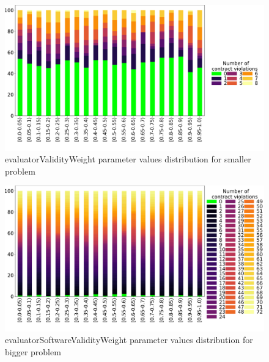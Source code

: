 \begin{figure}
	\centering
	\includegraphics[width=\textwidth]{images/DistrValiditySmall/evaluatorValidityWeight.pdf}
	\caption[evaluatorValidityWeight parameter values distribution for smaller problem]{evaluatorValidityWeight parameter values distribution for smaller problem}
	\label{fig:evaluatorValidityWeight_DistSmall}
\end{figure}
\begin{figure}
	\centering
	\includegraphics[width=\textwidth]{images/DistrValidityBig/evaluatorSoftwareValidityWeight.pdf}
	\caption[evaluatorSoftwareValidityWeight parameter values distribution for bigger problem]{evaluatorSoftwareValidityWeight parameter values distribution for bigger problem}
	\label{fig:evaluatorSoftwareValidityWeight_DistBig}
\end{figure}
